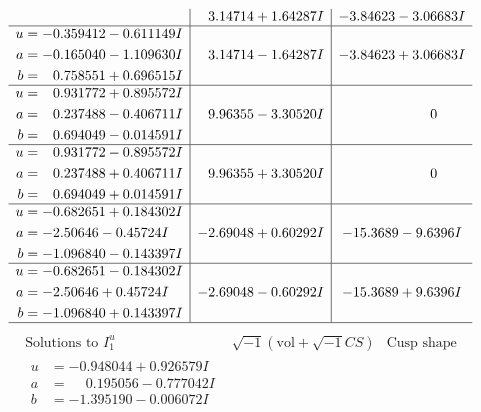 \documentclass[1p]{elsarticle_modified}
\theoremstyle{definition}
\newcommand{\I}{\sqrt{-1}}
\begin{document}
$$\begin{array}{c|c|c}
 & \phantom{-}3.14714 + 1.64287 I & -3.84623 - 3.06683 I \\ \hline\begin{aligned}
u &= -0.359412 - 0.611149 I \\
a &= -0.165040 - 1.109630 I \\
b &= \phantom{-}0.758551 + 0.696515 I\end{aligned}
 & \phantom{-}3.14714 - 1.64287 I & -3.84623 + 3.06683 I \\ \hline\begin{aligned}
u &= \phantom{-}0.931772 + 0.895572 I \\
a &= \phantom{-}0.237488 - 0.406711 I \\
b &= \phantom{-}0.694049 - 0.014591 I\end{aligned}
 & \phantom{-}9.96355 - 3.30520 I & \phantom{-0.000000 } 0 \\ \hline\begin{aligned}
u &= \phantom{-}0.931772 - 0.895572 I \\
a &= \phantom{-}0.237488 + 0.406711 I \\
b &= \phantom{-}0.694049 + 0.014591 I\end{aligned}
 & \phantom{-}9.96355 + 3.30520 I & \phantom{-0.000000 } 0 \\ \hline\begin{aligned}
u &= -0.682651 + 0.184302 I \\
a &= -2.50646 - 0.45724 I \\
b &= -1.096840 - 0.143397 I\end{aligned}
 & -2.69048 + 0.60292 I & -15.3689 - 9.6396 I \\ \hline\begin{aligned}
u &= -0.682651 - 0.184302 I \\
a &= -2.50646 + 0.45724 I \\
b &= -1.096840 + 0.143397 I\end{aligned}
 & -2.69048 - 0.60292 I & -15.3689 + 9.6396 I\\
 \hline 
 \end{array}$$\newpage$$\begin{array}{c|c|c}  
\text{Solutions to }I^u_{1}& \I (\text{vol} + \sqrt{-1}CS) & \text{Cusp shape}\\
 \hline 
\begin{aligned}
u &= -0.948044 + 0.926579 I \\
a &= \phantom{-}0.195056 - 0.777042 I \\
b &= -1.395190 - 0.006072 I\end{aligned}

\end{array}$$
\end{document}
